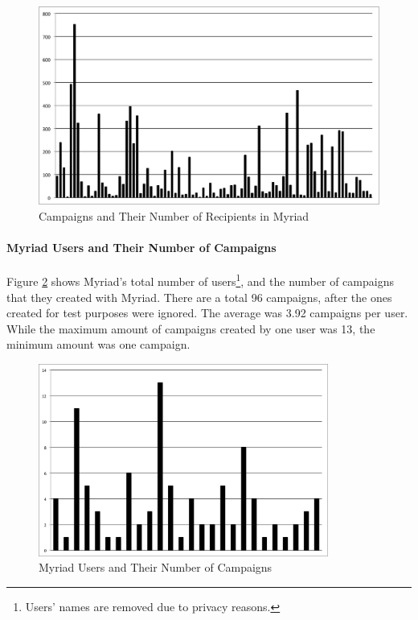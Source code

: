 \begin{figure}[htbp]
	\centering
	\includegraphics[width=1.00\textwidth]{imgs/ChartCampaignsRecipients.png}
	\caption[Campaigns and Their Number of Recipients in Myriad]{Campaigns and Their Number of Recipients in Myriad}
	\label{fig:ChartCampaignsRecipients}
\end{figure}

\paragraph{Myriad Users and Their Number of Campaigns} Figure \ref{fig:ChartUsersCampaigns} shows Myriad's total number of users\footnote{Users' names are removed due to privacy reasons.}, and the number of campaigns that they created with Myriad. There are a total 96 campaigns, after the ones created for test purposes were ignored. The average was 3.92 campaigns per user. While the maximum amount of campaigns created by one user was 13, the minimum amount was one campaign.

\begin{figure}[htbp]
	\centering
	\includegraphics[width=0.85\textwidth]{imgs/ChartUsersCampaigns.png}
	\caption[Myriad Users and Their Number of Campaigns]{Myriad Users and Their Number of Campaigns}
	\label{fig:ChartUsersCampaigns}
\end{figure}

